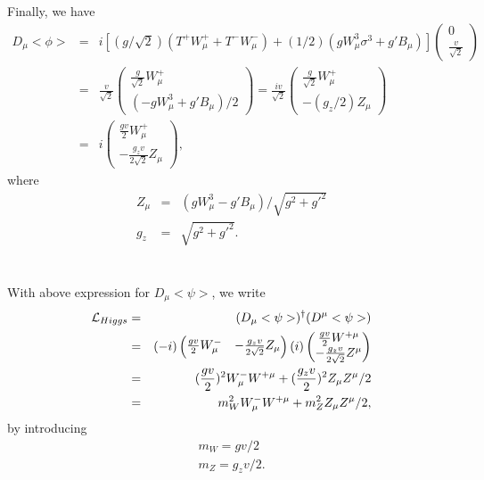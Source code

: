 \documentclass[11pt]{article}
\begin{document}
Finally, we have
\begin{eqnarray}
  D_\mu <\phi>
  &=&i[(g/\sqrt2)(T^+W^+_\mu+T^-W^-_\mu)+(1/2)(gW^3_\mu \sigma^3+g'B_\mu)]
  \begin{pmatrix}
    0 \\ \frac{v}{\sqrt 2}
  \end{pmatrix} \\
  &=&\frac{v}{\sqrt 2}
  \begin{pmatrix}
    \frac{g}{\sqrt 2} W^+_\mu \\ (-gW^3_\mu+g'B_\mu)/2
  \end{pmatrix} 
   =\frac{iv}{\sqrt 2} 
   \begin{pmatrix}
    \frac{g}{\sqrt 2} W^+_\mu \\ -(g_z/2) Z_\mu
  \end{pmatrix}\\
   &=& i
   \begin{pmatrix}
    \frac{gv}{2} W^+_\mu \\ -\frac{g_zv}{2\sqrt2} Z_\mu
   \end{pmatrix},
\end{eqnarray}
where
\begin{eqnarray}
  Z_\mu &=& (g W^3_\mu - g' B_\mu)/\sqrt{ g^2 + g'^2 } \\
  g_z &=& \sqrt{ g^2 + g'^2 }.
\end{eqnarray}

\section{ }
With above expression for $D_\mu <\psi>$, we write
\begin{eqnarray}
  {\cal L}_{Higgs}&=&(D_\mu <\psi>)^\dagger (D^\mu <\psi>) \\
  &=& (-i)
  \begin{pmatrix}
    \frac{gv}{2}W^-_\mu & -\frac{g_z v}{2 \sqrt 2}Z_\mu
  \end{pmatrix}
  (i)
  \begin{pmatrix}
    \frac{gv}{2}W^{+\mu} \\ -\frac{g_z v}{2 \sqrt 2}Z^\mu
  \end{pmatrix} \\
  &=&(\frac{gv}{2})^2 W^-_\mu W^{+\mu}+ (\frac{g_zv}{2})^2Z_\mu Z^\mu/2 \\
  &=&m_W^2 W^-_\mu W^{+ \mu} + m_Z^2 Z_\mu Z^\mu/2,
\end{eqnarray}
by introducing
\begin{eqnarray}
  m_W = g v/2 \\
  m_Z = g_z v/2.
\end{eqnarray}
\end{document}
